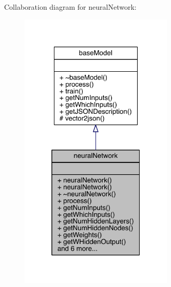 Collaboration diagram for neural\+Network\+:
\nopagebreak
\begin{figure}[H]
\begin{center}
\leavevmode
\includegraphics[width=208pt]{classneural_network__coll__graph}
\end{center}
\end{figure}
